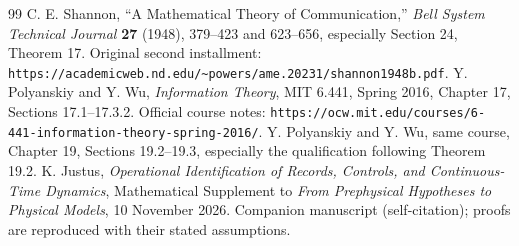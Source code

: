 \documentclass{article}
\begin{document}
\begin{thebibliography}{99}
 C. E. Shannon, ``A Mathematical Theory of Communication,'' \emph{Bell System Technical Journal} \textbf{27} (1948), 379--423 and 623--656, especially Section 24, Theorem 17. Original second installment: \texttt{https://academicweb.nd.edu/\~{}powers/ame.20231/shannon1948b.pdf}.
 Y. Polyanskiy and Y. Wu, \emph{Information Theory}, MIT 6.441, Spring 2016, Chapter 17, Sections 17.1--17.3.2. Official course notes: \texttt{https://ocw.mit.edu/courses/6-441-information-theory-spring-2016/}.
 Y. Polyanskiy and Y. Wu, same course, Chapter 19, Sections 19.2--19.3, especially the qualification following Theorem 19.2.
 K. Justus, \emph{Operational Identification of Records, Controls, and Continuous-Time Dynamics}, Mathematical Supplement to \emph{From Prephysical Hypotheses to Physical Models}, 10 November 2026. Companion manuscript (self-citation); proofs are reproduced with their stated assumptions.
\end{thebibliography}
\end{document}
